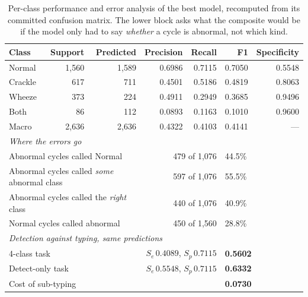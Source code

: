 \documentclass[journal,onecolumn]{IEEEtran}
\newcommand{\best}[1]{\textbf{#1}}
\begin{document}
\begin{table}[!t]
\centering
\caption{Per-class performance and error analysis of the best model, recomputed from its
committed confusion matrix. The lower block asks what the composite would be if the model
only had to say \emph{whether} a cycle is abnormal, not which kind.}
\label{tab:errors}
\footnotesize
\begin{tabular}{lrrrrrr}
\toprule
Class & Support & Predicted & Precision & Recall & F1 & Specificity \\
\midrule
Normal  & 1{,}560 & 1{,}589 & 0.6986 & 0.7115 & 0.7050 & 0.5548 \\
Crackle & \phantom{0,}617 & \phantom{0,}711 & 0.4501 & 0.5186 & 0.4819 & 0.8063 \\
Wheeze  & \phantom{0,}373 & \phantom{0,}224 & 0.4911 & 0.2949 & 0.3685 & 0.9496 \\
Both    & \phantom{00,}86 & \phantom{0,}112 & 0.0893 & 0.1163 & 0.1010 & 0.9600 \\
Macro   & 2{,}636 & 2{,}636 & 0.4322 & 0.4103 & 0.4141 & --- \\
\midrule
\multicolumn{7}{l}{\emph{Where the errors go}}\\
\multicolumn{3}{l}{Abnormal cycles called Normal} & \multicolumn{2}{r}{479 of 1{,}076} & \multicolumn{2}{l}{44.5\%} \\
\multicolumn{3}{l}{Abnormal cycles called \emph{some} abnormal class} & \multicolumn{2}{r}{597 of 1{,}076} & \multicolumn{2}{l}{55.5\%} \\
\multicolumn{3}{l}{Abnormal cycles called the \emph{right} class} & \multicolumn{2}{r}{440 of 1{,}076} & \multicolumn{2}{l}{40.9\%} \\
\multicolumn{3}{l}{Normal cycles called abnormal} & \multicolumn{2}{r}{450 of 1{,}560} & \multicolumn{2}{l}{28.8\%} \\
\midrule
\multicolumn{7}{l}{\emph{Detection against typing, same predictions}}\\
\multicolumn{3}{l}{4-class task} & \multicolumn{2}{r}{$S_e\,0.4089$, $S_p\,0.7115$} & \multicolumn{2}{l}{\best{0.5602}} \\
\multicolumn{3}{l}{Detect-only task} & \multicolumn{2}{r}{$S_e\,0.5548$, $S_p\,0.7115$} & \multicolumn{2}{l}{\best{0.6332}} \\
\multicolumn{3}{l}{Cost of sub-typing} & \multicolumn{2}{r}{} & \multicolumn{2}{l}{\best{0.0730}} \\
\bottomrule
\end{tabular}
\end{table}
\end{document}
